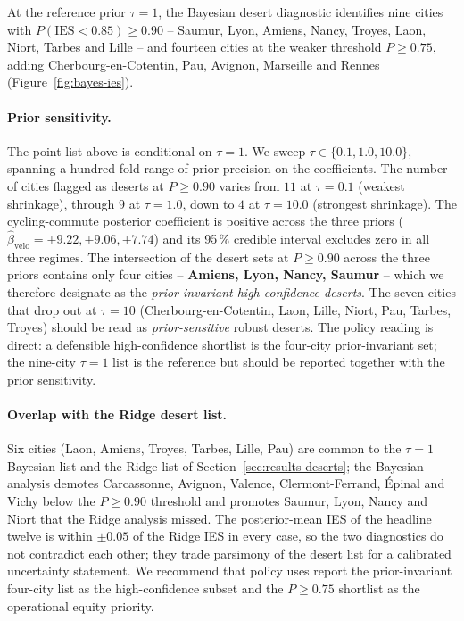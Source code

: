 \documentclass[11pt,a4paper]{article}
\newcommand{\IES}{\mathrm{IES}}
\begin{document}
At the reference prior $\tau = 1$, the Bayesian desert diagnostic
identifies nine cities with $P(\IES < 0.85) \geq 0.90$ -- Saumur,
Lyon, Amiens, Nancy, Troyes, Laon, Niort, Tarbes and Lille -- and
fourteen cities at the weaker threshold $P \geq 0.75$, adding
Cherbourg-en-Cotentin, Pau, Avignon, Marseille and Rennes
(Figure~\ref{fig:bayes-ies}).

\paragraph{Prior sensitivity.}
The point list above is conditional on $\tau = 1$. We sweep
$\tau \in \{0.1, 1.0, 10.0\}$, spanning a hundred-fold range of
prior precision on the coefficients. The number of cities flagged
as deserts at $P \geq 0.90$ varies from $11$ at $\tau = 0.1$
(weakest shrinkage), through $9$ at $\tau = 1.0$, down to $4$ at
$\tau = 10.0$ (strongest shrinkage). The cycling-commute
posterior coefficient is positive across the three priors
($\hat\beta_{\text{velo}} = +9.22, +9.06, +7.74$) and its 95\,\%
credible interval excludes zero in all three regimes. The
intersection of the desert sets at $P \geq 0.90$ across the three
priors contains only four cities -- \textbf{Amiens, Lyon, Nancy,
Saumur} -- which we therefore designate as the
\emph{prior-invariant high-confidence deserts}. The seven cities
that drop out at $\tau = 10$ (Cherbourg-en-Cotentin, Laon, Lille,
Niort, Pau, Tarbes, Troyes) should be read as
\emph{prior-sensitive} robust deserts. The policy reading is
direct: a defensible high-confidence shortlist is the four-city
prior-invariant set; the nine-city $\tau = 1$ list is the
reference but should be reported together with the prior
sensitivity.

\paragraph{Overlap with the Ridge desert list.}
Six cities (Laon, Amiens, Troyes, Tarbes, Lille, Pau) are common
to the $\tau = 1$ Bayesian list and the Ridge list of
Section~\ref{sec:results-deserts}; the Bayesian analysis demotes
Carcassonne, Avignon, Valence, Clermont-Ferrand, \'Epinal and
Vichy below the $P \geq 0.90$ threshold and promotes Saumur, Lyon,
Nancy and Niort that the Ridge analysis missed. The
posterior-mean IES of the headline twelve is within $\pm 0.05$ of
the Ridge IES in every case, so the two diagnostics do not
contradict each other; they trade parsimony of the desert list
for a calibrated uncertainty statement. We recommend that policy
uses report the prior-invariant four-city list as the
high-confidence subset and the $P \geq 0.75$ shortlist as the
operational equity priority.
\end{document}
